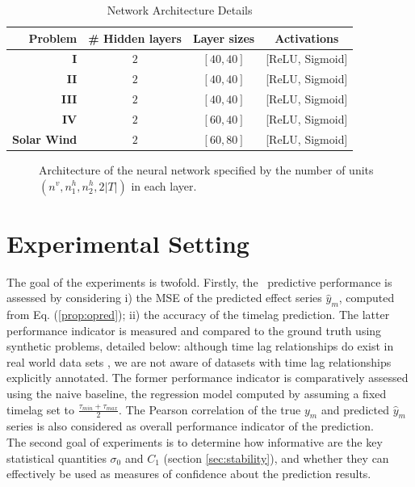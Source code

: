 \begin{table}[htbp]
  \caption{Network Architecture Details}\label{tab:arch_probs}
  \centering
  \begin{tabular}{ r c c c }
  \hline
  Problem &  \# Hidden layers & Layer sizes & Activations\\
  \hline
  \textbf{I} & $2$ & $[40, 40]$  & [ReLU, Sigmoid]\\
  \textbf{II} & $2$ & $[40, 40]$ & [ReLU, Sigmoid]\\
  \textbf{III} & $2$ & $[40, 40]$ & [ReLU, Sigmoid]\\
  \textbf{IV} & $2$ & $[60, 40]$ & [ReLU, Sigmoid]\\
  \textbf{Solar Wind} & $2$ & $[60, 80]$ & [ReLU, Sigmoid]\\
  \hline
  \end{tabular}
  \label{tab:exp}
\end{table}


\begin{figure}[ht]
\centerline{\resizebox*{0.7\textwidth}{!}{}}
\caption{\label{fig:archi} Architecture of the neural network specified by the number of units 
$(n^v,n_1^h,n_2^h,2\vert T\vert)$ in each layer.}
\label{fig:NN}
\end{figure}

\section{Experimental Setting}\label{sec:exp}

The goal of the experiments is twofold. Firstly, the \XX\ predictive performance is assessed by considering i) the MSE of the predicted effect series $\hat y_m$, computed from Eq. (\ref{prop:opred}); 
ii) the accuracy of the timelag prediction. The latter performance indicator is measured and compared to the ground truth using synthetic problems, detailed below: although time lag relationships do exist in real world data sets \citep{doi:10.1002/jgra.50429,ZHOU2006195}, we are not aware of datasets with time lag relationships explicitly annotated. The former performance indicator is comparatively assessed using the naive baseline, the regression model computed by assuming a fixed timelag set to $\frac{\tau_{min}+\tau_{max}}{2}$. The Pearson correlation of the true $y_m$ and predicted $\hat y_m$ series is also considered as overall performance indicator of the prediction.\\
The second goal of experiments is to determine how informative are the key statistical quantities $\sigma_0$ and $C_1$ (section \ref{sec:stability}), and whether they can effectively be used as measures of confidence about the prediction results. 

